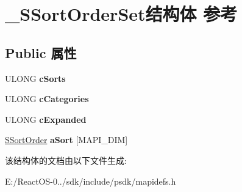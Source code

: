 \hypertarget{struct___s_sort_order_set}{}\section{\+\_\+\+S\+Sort\+Order\+Set结构体 参考}
\label{struct___s_sort_order_set}
\subsection*{Public 属性}
\begin{DoxyCompactItemize}
\item 
\mbox{\label{struct___s_sort_order_set_a6f02392408484abcedc92fc664b85c23}} 
U\+L\+O\+NG {\bfseries c\+Sorts}
\item 
\mbox{\label{struct___s_sort_order_set_a9c812cc733999626983cf2ca69278337}} 
U\+L\+O\+NG {\bfseries c\+Categories}
\item 
\mbox{\label{struct___s_sort_order_set_a9aec3924a4137b73d6316d0579c79240}} 
U\+L\+O\+NG {\bfseries c\+Expanded}
\item 
\mbox{\label{struct___s_sort_order_set_afa65eb49fb22bbec4ca6b73d6e214ac7}} 
\hyperlink{struct___s_sort_order}{S\+Sort\+Order} {\bfseries a\+Sort} \mbox{[}M\+A\+P\+I\+\_\+\+D\+IM\mbox{]}
\end{DoxyCompactItemize}


该结构体的文档由以下文件生成\+:\begin{DoxyCompactItemize}
\item 
E\+:/\+React\+O\+S-\/0../sdk/include/psdk/mapidefs.\+h\end{DoxyCompactItemize}
